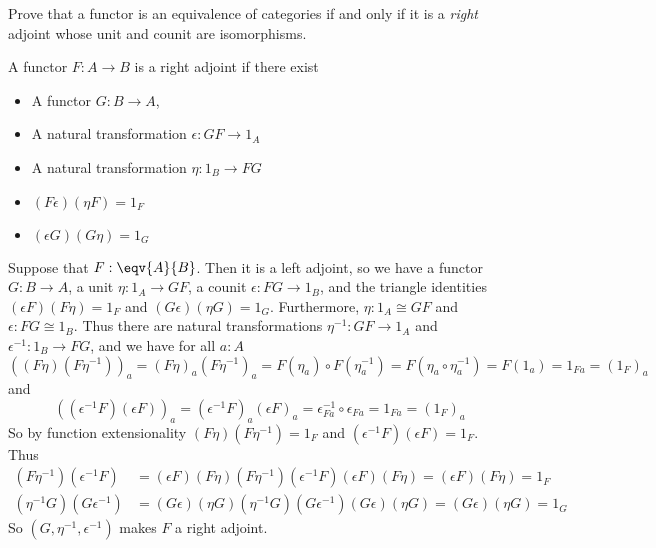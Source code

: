 Prove that a functor is an equivalence of categories if and only if it is a
\emph{right} adjoint whose unit and counit are isomorphisms.


 \soln
A functor $F : A \to B$ is a right adjoint if there exist



\begin{itemize}
\item  A functor $G : B \to A$,

\item  A natural transformation $\epsilon : GF \to 1_{A}$

\item  A natural transformation $\eta : 1_{B} \to FG$

\item  $(F\epsilon)(\eta F) = 1_{F}$

\item  $(\epsilon G)(G\eta) = 1_{G}$

\end{itemize}


\noindent
Suppose that $F : \eqv{A}{B}$.  Then it is a left adjoint, so we have a
functor $G : B \to A$, a unit $\eta : 1_{A} \to GF$, a counit $\epsilon : FG
\to 1_{B}$, and the triangle identities $(\epsilon F)(F \eta) = 1_{F}$ and $(G
\epsilon)(\eta G) = 1_{G}$.  Furthermore, $\eta : 1_{A} \cong GF$ and $\epsilon
: FG \cong 1_{B}$.  Thus there are natural transformations $\eta^{-1} : GF \to
1_{A}$ and $\epsilon^{-1} : 1_{B} \to FG$, and we have for all $a : A$
\[
  \left((F\eta)(F\eta^{-1})\right)_{a}
  =
  (F\eta)_{a}(F\eta^{-1})_{a}
  =
  F(\eta_{a}) \circ F(\eta^{-1}_{a})
  =
  F(\eta_{a} \circ \eta^{-1}_{a})
  =
  F(1_{a})
  =
  1_{Fa}
  =
  (1_{F})_{a}
\]
and
\[
  \left((\epsilon^{-1}F)(\epsilon F)\right)_{a}
  =
  (\epsilon^{-1}F)_{a}(\epsilon F)_{a}
  =
  \epsilon^{-1}_{Fa} \circ \epsilon_{Fa}
  =
  1_{Fa}
  =
  (1_{F})_{a}
\]
So by function extensionality $(F\eta)(F\eta^{-1}) = 1_{F}$ and
$(\epsilon^{-1}F)(\epsilon F) = 1_{F}$.  Thus
\begin{align*}
  (F\eta^{-1})(\epsilon^{-1}F)
  &=
  (\epsilon F)(F\eta)
  (F\eta^{-1})(\epsilon^{-1}F)
  (\epsilon F)(F \eta)
  =
  (\epsilon F)
  (F \eta)
  =
  1_{F}
  \\
  (\eta^{-1}G)(G\epsilon^{-1})
  &=
  (G\epsilon)(\eta G)
  (\eta^{-1}G)(G\epsilon^{-1})
  (G\epsilon)(\eta G)
  =
  (G\epsilon)
  (\eta G)
  =
  1_{G}
\end{align*}
So $(G, \eta^{-1}, \epsilon^{-1})$ makes $F$ a right adjoint.


